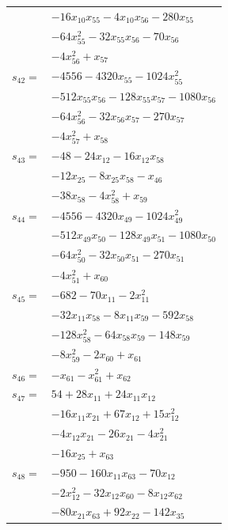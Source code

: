 \begin{longtable}{@{}r@{\;}l@{}}
 & \(\displaystyle -16x_{10}x_{55} -4x_{10}x_{56} -280x_{55}\) \\
 & \(\displaystyle -64x_{55}^{2} -32x_{55}x_{56} -70x_{56}\) \\
 & \(\displaystyle -4x_{56}^{2} +x_{57}\) \\[3pt]
\(s_{42}=\) & \(\displaystyle -4556 -4320x_{55} -1024x_{55}^{2}\) \\
 & \(\displaystyle -512x_{55}x_{56} -128x_{55}x_{57} -1080x_{56}\) \\
 & \(\displaystyle -64x_{56}^{2} -32x_{56}x_{57} -270x_{57}\) \\
 & \(\displaystyle -4x_{57}^{2} +x_{58}\) \\[3pt]
\(s_{43}=\) & \(\displaystyle -48 -24x_{12} -16x_{12}x_{58}\) \\
 & \(\displaystyle -12x_{25} -8x_{25}x_{58} -x_{46}\) \\
 & \(\displaystyle -38x_{58} -4x_{58}^{2} +x_{59}\) \\[3pt]
\(s_{44}=\) & \(\displaystyle -4556 -4320x_{49} -1024x_{49}^{2}\) \\
 & \(\displaystyle -512x_{49}x_{50} -128x_{49}x_{51} -1080x_{50}\) \\
 & \(\displaystyle -64x_{50}^{2} -32x_{50}x_{51} -270x_{51}\) \\
 & \(\displaystyle -4x_{51}^{2} +x_{60}\) \\[3pt]
\(s_{45}=\) & \(\displaystyle -682 -70x_{11} -2x_{11}^{2}\) \\
 & \(\displaystyle -32x_{11}x_{58} -8x_{11}x_{59} -592x_{58}\) \\
 & \(\displaystyle -128x_{58}^{2} -64x_{58}x_{59} -148x_{59}\) \\
 & \(\displaystyle -8x_{59}^{2} -2x_{60} +x_{61}\) \\[3pt]
\(s_{46}=\) & \(\displaystyle -x_{61} -x_{61}^{2} +x_{62}\) \\[3pt]
\(s_{47}=\) & \(\displaystyle 54 +28x_{11} +24x_{11}x_{12}\) \\
 & \(\displaystyle -16x_{11}x_{21} +67x_{12} +15x_{12}^{2}\) \\
 & \(\displaystyle -4x_{12}x_{21} -26x_{21} -4x_{21}^{2}\) \\
 & \(\displaystyle -16x_{25} +x_{63}\) \\[3pt]
\(s_{48}=\) & \(\displaystyle -950 -160x_{11}x_{63} -70x_{12}\) \\
 & \(\displaystyle -2x_{12}^{2} -32x_{12}x_{60} -8x_{12}x_{62}\) \\
 & \(\displaystyle -80x_{21}x_{63} +92x_{22} -142x_{35}\) \\

\end{longtable}
